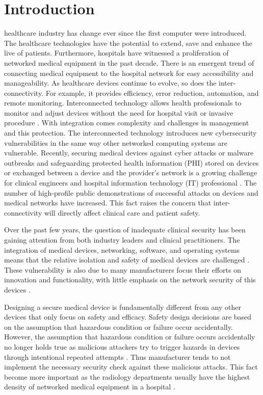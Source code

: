 \documentclass[pdf,bookmarks,colorlinks=true]{IEEEtran}
\begin{document}
\section{Introduction}
 healthcare industry has change ever since the first computer were introduced. The healthcare technologies have the potential to extend, save and enhance the live of patients. Furthermore, hospitals have witnessed a proliferation of networked medical equipment in the past decade. There is an emergent trend of connecting medical equipment to the hospital network for easy accessibility and manageability. As healthcare devices continue to evolve, so does the inter-connectivity. For example, it provides efficiency, error reduction, automation, and remote monitoring. Interconnected technology allows health professionals to monitor and adjust devices without the need for hospital visit or invasive procedure \cite{coventry2018cybersecurity}. With integration comes complexity and challenges in management and this protection. The interconnected technology introduces new cybersecurity vulnerabilities in the same way other networked computing systems are vulnerable. Recently, securing medical devices against cyber attacks or malware outbreaks and safeguarding protected health information (PHI) stored on devices or exchanged between a device and the provider's network is a growing challenge for clinical engineers and hospital information technology (IT) professional \cite{wirth2011cybercrimes}. The number of high-profile public demonstrations of successful attacks on devices and medical networks have increased. This fact raises the concern that inter-connectivity will directly affect clinical care and patient safety. \par
Over the past few years, the question of inadequate clinical security has been gaining attention from both industry leaders and clinical practitioners. The integration of medical devices, networking, software, and operating systems means that the relative isolation and safety of medical devices are challenged \cite{williams2015cybersecurity}. These vulnerability is also due to many manufacturers focus their efforts on innovation and functionality, with little emphasis on the network security of this devices \cite{moses2015lack}. \par
Designing a secure medical device is fundamentally different from  any other devices that only focus on safety and efficacy. Safety design decisions are based on the assumption that hazardous condition or failure occur accidentally. However, the assumption that hazardous condition or failure occurs accidentally no longer holds true as malicious attackers try to trigger hazards in devices through intentional repeated attempts \cite{Ray}. Thus manufacturer tends to not implement the necessary security check against these malicious attacks. This fact become more important as the radiology departments usually have the highest density of networked medical equipment in a hospital \cite{moses2015lack}. 
\end{document}
